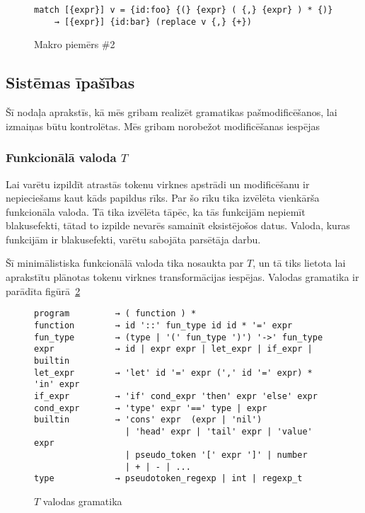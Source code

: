\begin{figure}[h!]
\begin{verbatim}
match [{expr}] v = {id:foo} {(} {expr} ( {,} {expr} ) * {)}
    → [{expr}] {id:bar} (replace v {,} {+})
\end{verbatim}
\caption{\label{fig:matchsample2}Makro piemērs \#2}
\end{figure}

\subsection{\label{subsec:system_qualities}Sistēmas īpašības}
Šī nodaļa aprakstīs, kā mēs gribam realizēt gramatikas pašmodificēšanos, lai izmaiņas būtu kontrolētas.
Mēs gribam norobežot modificēšanas iespējas

\subsubsection{Funkcionālā valoda $T$}
Lai varētu izpildīt atrastās tokenu virknes apstrādi un modificēšanu ir nepieciešams kaut kāds papildus rīks. Par šo rīku tika izvēlēta vienkārša funkcionāla valoda. Tā tika izvēlēta tāpēc, ka tās funkcijām nepiemīt blakusefekti, tātad to izpilde nevarēs samainīt eksistējošos datus. Valoda, kuras funkcijām ir blakusefekti, varētu sabojāta parsētāja darbu.

Šī minimālistiska funkcionālā valoda tika nosaukta par $T$, un tā tiks lietota lai aprakstītu plānotas tokenu virknes transformācijas iespējas. Valodas gramatika ir parādīta figūrā~\ref{fig:tlanguagegrammar}

\begin{figure}
\begin{verbatim}
program         → ( function ) *
function        → id '::' fun_type id id * '=' expr
fun_type        → (type | '(' fun_type ')') '->' fun_type
expr            → id | expr expr | let_expr | if_expr | builtin
let_expr        → 'let' id '=' expr (',' id '=' expr) * 'in' expr
if_expr         → 'if' cond_expr 'then' expr 'else' expr
cond_expr       → 'type' expr '==' type | expr
builtin         → 'cons' expr  (expr | 'nil') 
                  | 'head' expr | 'tail' expr | 'value' expr
                  | pseudo_token '[' expr ']' | number
                  | + | - | ...
type            → pseudotoken_regexp | int | regexp_t
\end{verbatim}
\caption{\label{fig:tlanguagegrammar}$T$ valodas gramatika}
\end{figure}

